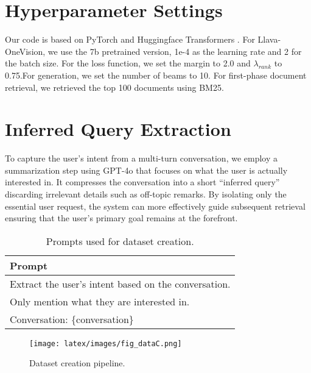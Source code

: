 \documentclass[11pt]{article}
\begin{document}
\section{Hyperparameter Settings}
\label{sec:appendixB}
Our code is based on PyTorch \cite{pytorch} and Huggingface Transformers \cite{HuggingFace}. For Llava-OneVision, we use the 7b pretrained version, 1e-4 as the learning rate and 2 for the batch size. For the loss function, we set the margin to 2.0 and \(\lambda_{rank}\) to 0.75.For generation, we set the number of beams to 10. For first-phase document retrieval, we retrieved the top 100 documents using BM25.


\section{Inferred Query Extraction}
\label{sec:appendiC}
To capture the user’s intent from a multi-turn conversation, we employ a summarization step using GPT-4o that focuses on what the user is actually interested in. It compresses the conversation into a short “inferred query” discarding irrelevant details such as off-topic remarks. By isolating only the essential user request, the system can more effectively guide subsequent retrieval ensuring that the user’s primary goal remains at the forefront.

\begin{table}[!h]
    \centering
    \setlength{\tabcolsep}{3mm}
    \begin{adjustbox}{max width=1\columnwidth}
    {\LARGE
    \begin{tabular}{l}
    \toprule
    Prompt \\
    \midrule
    Extract the user's intent based on the conversation. \\ Only mention what they are interested in. \\
     Conversation: \{conversation\} \\
    
    \bottomrule
    \end{tabular}
    }
    \end{adjustbox}
\caption{Prompts used for dataset creation.}
\label{tab:query_extract}
\end{table}



\begin{figure*}[!t]
    \centering
    \texttt{[image: latex/images/fig\_dataC.png]}
    \caption{Dataset creation pipeline.}
    \label{fig:dataset_creation}
    \vspace{-1.5mm}
\end{figure*}


\end{document}
